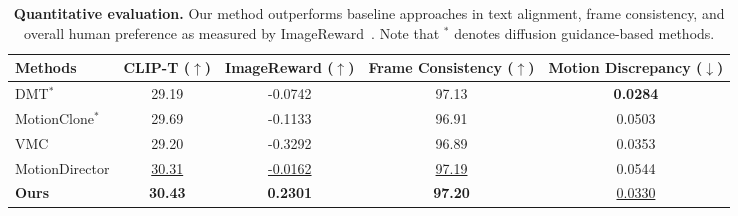 \begin{table*}[t]
  \centering
  \begin{tabular}{lcccc}
    \toprule
    Methods & CLIP-T ($\uparrow$) & ImageReward ($\uparrow$) & \makecell{Frame\\Consistency ($\uparrow$)} & \makecell{Motion\\Discrepancy ($\downarrow$)} \\
    \midrule
    DMT$^*$ & 29.19 & -0.0742 & 97.13 & \textbf{0.0284} \\
    MotionClone$^*$ & 29.69 & -0.1133	& 96.91 & 0.0503 \\
    VMC & 29.20 & -0.3292 & 96.89 & 0.0353 \\
    MotionDirector & \underline{30.31} & \underline{-0.0162} & \underline{97.19} & 0.0544 \\
    \textbf{Ours} & \textbf{30.43} & \textbf{0.2301} & \textbf{97.20} & \underline{0.0330} \\
    \bottomrule
  \end{tabular}
  \caption{{\bf Quantitative evaluation.} Our method outperforms baseline approaches in text alignment, frame consistency, and overall human preference as measured by ImageReward~\cite{ir}. Note that $^*$ denotes diffusion guidance-based methods.}
  \label{tab:quantitative}
\end{table*}